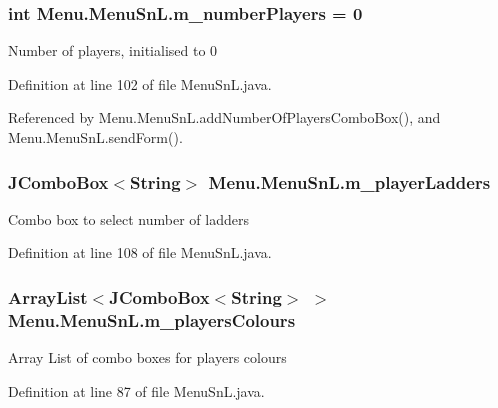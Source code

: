 \subsubsection[{m\+\_\+number\+Players}]{\setlength{\rightskip}{0pt plus 5cm}int Menu.\+Menu\+Sn\+L.\+m\+\_\+number\+Players = 0\hspace{0.3cm}{\ttfamily [private]}}\label{class_menu_1_1_menu_sn_l_afee3307aa062adfbee4edd14484c8f2c}
Number of players, initialised to 0 

Definition at line 102 of file Menu\+Sn\+L.\+java.



Referenced by Menu.\+Menu\+Sn\+L.\+add\+Number\+Of\+Players\+Combo\+Box(), and Menu.\+Menu\+Sn\+L.\+send\+Form().

\hypertarget{class_menu_1_1_menu_sn_l_a75cae58abbeef1dc893ab2214f84aaad}{}
\subsubsection[{m\+\_\+player\+Ladders}]{\setlength{\rightskip}{0pt plus 5cm}J\+Combo\+Box$<$String$>$ Menu.\+Menu\+Sn\+L.\+m\+\_\+player\+Ladders\hspace{0.3cm}{\ttfamily [private]}}\label{class_menu_1_1_menu_sn_l_a75cae58abbeef1dc893ab2214f84aaad}
Combo box to select number of ladders 

Definition at line 108 of file Menu\+Sn\+L.\+java.

\hypertarget{class_menu_1_1_menu_sn_l_a99b5b387a1ff9257d77534ebff7ca370}{}
\subsubsection[{m\+\_\+players\+Colours}]{\setlength{\rightskip}{0pt plus 5cm}Array\+List$<$J\+Combo\+Box$<$String$>$ $>$ Menu.\+Menu\+Sn\+L.\+m\+\_\+players\+Colours\hspace{0.3cm}{\ttfamily [private]}}\label{class_menu_1_1_menu_sn_l_a99b5b387a1ff9257d77534ebff7ca370}
Array List of combo boxes for player\textquotesingle{}s colours 

Definition at line 87 of file Menu\+Sn\+L.\+java.

